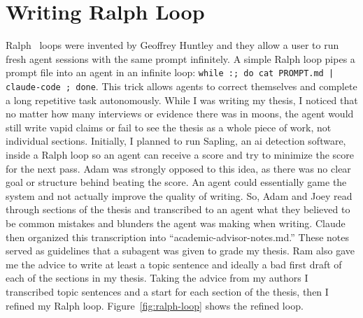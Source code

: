 \section{Writing Ralph Loop}

Ralph~\cite{huntley2025ralph} loops were invented by Geoffrey Huntley and they allow a user to run fresh agent sessions with the same prompt infinitely. A simple Ralph loop pipes a prompt file into an agent in an infinite loop: \texttt{while :; do cat PROMPT.md | claude-code ; done}. This trick allows agents to correct themselves and complete a long repetitive task autonomously. While I was writing my thesis, I noticed that no matter how many interviews or evidence there was in moons, the agent would still write vapid claims or fail to see the thesis as a whole piece of work, not individual sections. Initially, I planned to run Sapling, an ai detection software, inside a Ralph loop so an agent can receive a score and try to minimize the score for the next pass. Adam was strongly opposed to this idea, as there was no clear goal or structure behind beating the score. An agent could essentially game the system and not actually improve the quality of writing. So, Adam and Joey read through sections of the thesis and transcribed to an agent what they believed to be common mistakes and blunders the agent was making when writing. Claude then organized this transcription into ``academic-advisor-notes.md.'' These notes served as guidelines that a subagent was given to grade my thesis. Ram also gave me the advice to write at least a topic sentence and ideally a bad first draft of each of the sections in my thesis. Taking the advice from my authors I transcribed topic sentences and a start for each section of the thesis, then I refined my Ralph loop. Figure~\ref{fig:ralph-loop} shows the refined loop.

\begin{center}
\label{fig:ralph-loop}
\end{center}


